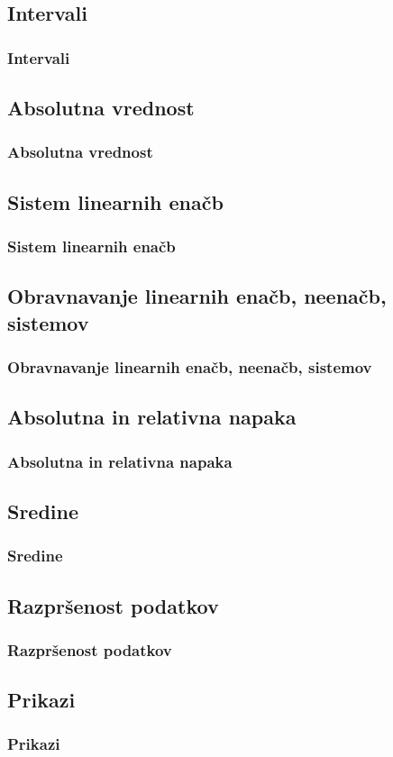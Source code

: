    \subsection{Intervali}

        \begin{frame}
            \frametitle{Intervali}
        \end{frame}

    \subsection{Absolutna vrednost}

        \begin{frame}
            \frametitle{Absolutna vrednost}
        \end{frame}

    \subsection{Sistem linearnih enačb}

        \begin{frame}
            \frametitle{Sistem linearnih enačb}
        \end{frame}

    \subsection{Obravnavanje linearnih enačb, neenačb, sistemov}

        \begin{frame}
            \frametitle{Obravnavanje linearnih enačb, neenačb, sistemov}
        \end{frame}

    \subsection{Absolutna in relativna napaka}

        \begin{frame}
            \frametitle{Absolutna in relativna napaka}
        \end{frame}

    \subsection{Sredine}

        \begin{frame}
            \frametitle{Sredine}
        \end{frame}

    \subsection{Razpršenost podatkov}

        \begin{frame}
            \frametitle{Razpršenost podatkov}
        \end{frame}

    \subsection{Prikazi}
        
        \begin{frame}
            \frametitle{Prikazi}
        \end{frame}